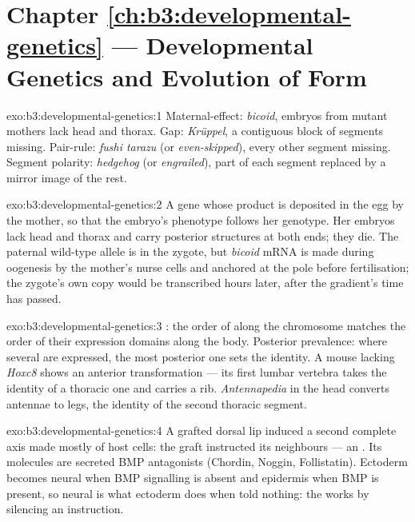 \section*{Chapter \ref{ch:b3:developmental-genetics} --- Developmental Genetics and Evolution of Form}

\begin{solution}{exo:b3:developmental-genetics:1}
Maternal-effect: \emph{bicoid}, embryos from mutant mothers lack head
and thorax. Gap: \emph{Krüppel}, a contiguous block of segments
missing. Pair-rule: \emph{fushi tarazu} (or \emph{even-skipped}), every
other segment missing. Segment polarity: \emph{hedgehog} (or
\emph{engrailed}), part of each segment replaced by a mirror image of
the rest.
\end{solution}

\begin{solution}{exo:b3:developmental-genetics:2}
A gene whose product is deposited in the egg by the mother, so that the
embryo's phenotype follows her genotype. Her embryos lack head and
thorax and carry posterior structures at both ends; they die. The
paternal wild-type allele is in the zygote, but \emph{bicoid} mRNA is
made during oogenesis by the mother's nurse cells and anchored at the
pole before fertilisation; the zygote's own copy would be transcribed
hours later, after the gradient's time has passed.
\end{solution}

\begin{solution}{exo:b3:developmental-genetics:3}
: the order of  along the chromosome matches the
order of their expression domains along the body. Posterior prevalence:
where several are expressed, the most posterior one sets the identity.
A mouse lacking \emph{Hoxc8} shows an anterior transformation --- its
first lumbar vertebra takes the identity of a thoracic one and carries
a rib. \emph{Antennapedia} in the head converts antennae to legs, the
identity of the second thoracic segment.
\end{solution}

\begin{solution}{exo:b3:developmental-genetics:4}
A grafted dorsal lip induced a second complete axis made mostly of host
cells: the graft instructed its neighbours --- an . Its
molecules are secreted BMP antagonists (Chordin, Noggin, Follistatin).
Ectoderm becomes neural when BMP signalling is absent and epidermis
when BMP is present, so neural is what ectoderm does when told nothing:
the  works by silencing an instruction.
\end{solution}

